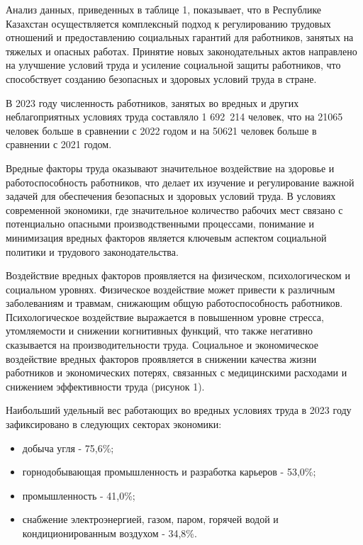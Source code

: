 \begin{multicols}{2}
Анализ данных, приведенных в таблице 1, показывает, что в Республике
Казахстан осуществляется комплексный подход к регулированию трудовых
отношений и предоставлению социальных гарантий для работников, занятых
на тяжелых и опасных работах. Принятие новых законодательных актов
направлено на улучшение условий труда и усиление социальной защиты
работников, что способствует созданию безопасных и здоровых условий
труда в стране.

В 2023 году численность работников, занятых во вредных и других
неблагоприятных условиях труда составляло 1 692~214 человек, что на
21065 человек больше в сравнении с 2022 годом и на 50621 человек больше
в сравнении с 2021 годом.

Вредные факторы труда оказывают значительное воздействие на здоровье и
работоспособность работников, что делает их изучение и регулирование
важной задачей для обеспечения безопасных и здоровых условий труда. В
условиях современной экономики, где значительное количество рабочих мест
связано с потенциально опасными производственными процессами, понимание
и минимизация вредных факторов является ключевым аспектом социальной
политики и трудового законодательства.

Воздействие вредных факторов проявляется на физическом, психологическом
и социальном уровнях. Физическое воздействие может привести к различным
заболеваниям и травмам, снижающим общую работоспособность работников.
Психологическое воздействие выражается в повышенном уровне стресса,
утомляемости и снижении когнитивных функций, что также негативно
сказывается на производительности труда. Социальное и экономическое
воздействие вредных факторов проявляется в снижении качества жизни
работников и экономических потерях, связанных с медицинскими расходами и
снижением эффективности труда (рисунок 1).

Наибольший удельный вес работающих во вредных условиях труда в 2023 году
зафиксировано в следующих секторах экономики:

\begin{itemize}
\item
  добыча угля - 75,6\%;
\item
  горнодобывающая промышленность и разработка карьеров - 53,0\%;
\item
  промышленность - 41,0\%;
\item
  снабжение электроэнергией, газом, паром, горячей водой и
  кондиционированным воздухом - 34,8\%.
\end{itemize}
\end{multicols}

